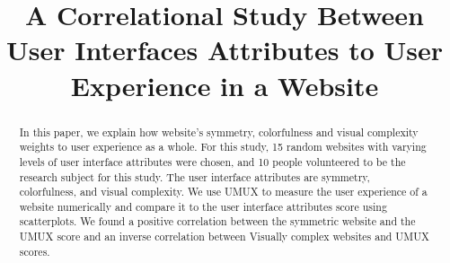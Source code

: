 \documentclass[conference]{IEEEtran}
\begin{document}
\title{A Correlational Study Between User Interfaces Attributes to User Experience in a Website
}

\author{
    \and
    \and
    \and
    \and
}

\maketitle

\begin{abstract}
    In this paper, we explain how website’s symmetry, colorfulness and visual complexity weights to user experience as a whole. For this study, 15 random websites with varying levels of user interface attributes were chosen, and 10 people volunteered to be the research subject for this study. The user interface attributes are symmetry, colorfulness, and visual complexity. We use UMUX to measure the user experience of a website numerically and compare it to the user interface attributes score using scatterplots. We found a positive correlation between the symmetric website and the UMUX score and an inverse correlation between Visually complex websites and UMUX scores.
\end{abstract}
\end{document}
